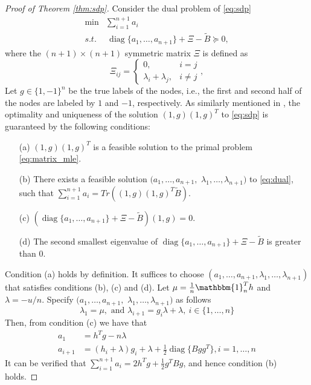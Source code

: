 \documentclass[conference]{IEEEtran}
\DeclareMathOperator{\diag}{diag}
\begin{document}
	\begin{proof}[Proof of Theorem \ref{thm:sdp}]
	Consider the dual problem of \eqref{eq:sdp}
	\begin{align}
		\min &\sum_{i=1}^{n+1} a_i \nonumber\\\label{eq:dual}
		s.t. &\, \diag\{a_1, \dots, a_{n+1}\} + \Xi - \widetilde{B} \succeq 0, 
	\end{align}
	where the $(n+1)\times (n+1)$ symmetric matrix $\Xi$ is defined as 
	\begin{equation}
		\Xi_{ij} = \begin{cases}
			0, & i=j \\
			\lambda_i + \lambda_j, & i\neq j
		\end{cases},
	\end{equation}
	Let $g\in\{1,-1\}^n$ be the true labels of the nodes, i.e., the first and second half of the nodes are labeled by $1$ and $-1$, respectively. As similarly mentioned in \cite{abbe2015exact},
	the optimality and uniqueness of the solution $(1,g)(1,g)^T$ to \eqref{eq:sdp} is guaranteed by the following conditions: 
	\begin{enumerate}
		\item[(a)] $(1,g)(1,g)^T$ is a feasible solution to the primal problem \eqref{eq:matrix_mle}.
		\item[(b)] There exists a feasible solution $(a_1,\ldots,a_{n+1},$ $\lambda_1,\ldots,\lambda_{n+1})$ to \eqref{eq:dual}, such that $\sum_{i=1}^{n+1} a_i=Tr((1,g)(1,g)^T\widetilde{B})$.
		\item[(c)] $(\diag\{a_1, \dots, a_{n+1}\} + \Xi - \widetilde{B})(1,g)=0$.
		\item[(d)] The second smallest eigenvalue of $\diag\{a_1, \dots, a_{n+1}\} + \Xi - \widetilde{B}$ is greater than $0$. 
	\end{enumerate}
	Condition (a) holds by definition. It suffices to choose $(a_1,\ldots,a_{n+1},\lambda_1,\ldots,\lambda_{n+1})$ that satisfies conditions (b), (c) and (d).
	Let $\mu=\frac{1}{n}\mathbbm{1}_n^T h$ and $\lambda = -u/n$. Specify $(a_1,\ldots,a_{n+1},$ $\lambda_1,\ldots,\lambda_{n+1})$ as follows
	$$\lambda_1=\mu, \text{ and }\lambda_{i+1}=g_i\lambda + \lambda,~i\in\{1,\ldots,n\}$$
	Then, from condition (c) we have that
	\begin{align}
		a_1 &= h^T g - n\lambda \nonumber\\
		a_{i+1} & = (h_i +\lambda)g_i + \lambda + \frac{1}{2}\diag\{Bgg^T\}, i = 1, \dots, n
	\end{align}
	It can be verified that $\sum_{i=1}^{n+1} a_i = 2h^Tg +\frac{1}{2} g^T B g$, and hence condition (b) holds.

\end{proof}
\end{document}
